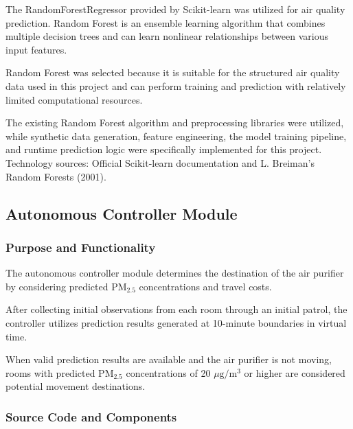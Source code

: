 \documentclass[conference]{IEEEtran}
\newcommand{\pmfine}{\ensuremath{\mathrm{PM}_{2.5}}}
\newcommand{\pmunit}{\ensuremath{\mu\mathrm{g}/\mathrm{m}^3}}
\begin{document}
The RandomForestRegressor provided by Scikit-learn was utilized for air quality prediction. Random Forest is an ensemble learning algorithm that combines multiple decision trees and can learn nonlinear relationships between various input features.

Random Forest was selected because it is suitable for the structured air quality data used in this project and can perform training and prediction with relatively limited computational resources.

The existing Random Forest algorithm and preprocessing libraries were utilized, while synthetic data generation, feature engineering, the model training pipeline, and runtime prediction logic were specifically implemented for this project. Technology sources: Official Scikit-learn documentation and L. Breiman's Random Forests (2001).

\subsection{Autonomous Controller Module}

\subsubsection{Purpose and Functionality}

The autonomous controller module determines the destination of the air purifier by considering predicted \pmfine{} concentrations and travel costs.

After collecting initial observations from each room through an initial patrol, the controller utilizes prediction results generated at 10-minute boundaries in virtual time.

When valid prediction results are available and the air purifier is not moving, rooms with predicted \pmfine{} concentrations of 20 \pmunit{} or higher are considered potential movement destinations.

\subsubsection{Source Code and Components}
\end{document}

